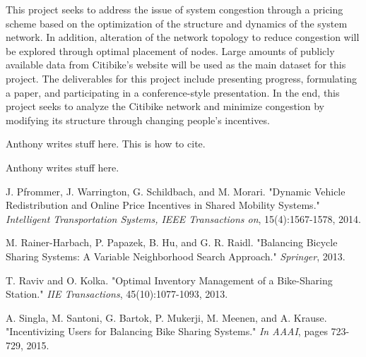 \documentclass[times, 10pt,twocolumn]{article}
\begin{document}
This project seeks to address the issue of system congestion through a pricing scheme based on the optimization of the structure and dynamics of the system network. In addition, alteration of the network topology to reduce congestion will be explored through optimal placement of nodes. Large amounts of publicly available data from Citibike's website will be used as the main dataset for this project. The deliverables for this project include presenting progress, formulating a paper, and participating in a conference-style presentation. In the end, this project seeks to analyze the Citibike network and minimize congestion by modifying its structure through changing people's incentives.


Anthony writes stuff here. This is how to cite. \cite{redistribution} %


Anthony writes stuff here.

\nocite{ex1,ex2}



\begin{thebibliography}{}

J. Pfrommer, J. Warrington, G. Schildbach, and M. Morari. "Dynamic Vehicle Redistribution and Online Price Incentives in Shared Mobility Systems." \textit{Intelligent Transportation Systems, IEEE Transactions on}, 15(4):1567-1578, 2014.

M. Rainer-Harbach, P. Papazek, B. Hu, and G. R. Raidl. "Balancing Bicycle Sharing Systems: A Variable Neighborhood Search Approach." \textit{Springer}, 2013.

T. Raviv and O. Kolka. "Optimal Inventory Management of a Bike-Sharing Station." \textit{IIE Transactions}, 45(10):1077-1093, 2013.

A. Singla, M. Santoni, G. Bartok, P. Mukerji, M. Meenen, and A. Krause. "Incentivizing Users for Balancing Bike Sharing Systems." \textit{In AAAI}, pages 723-729, 2015.

\end{thebibliography}
\end{document}
